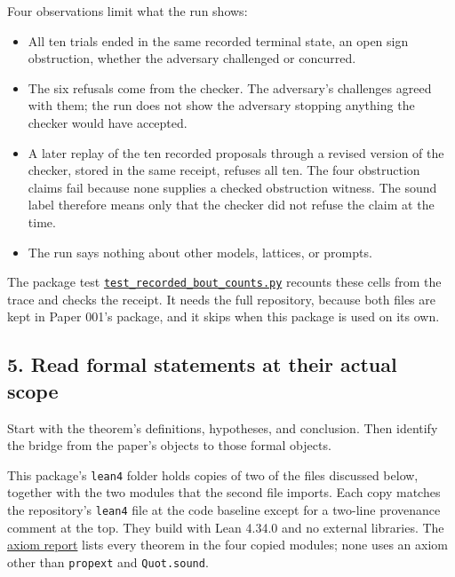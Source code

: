 \documentclass[
  11pt,
]{article}
\newcommand{\passthrough}[1]{#1}
\providecommand{\tightlist}{%
  \setlength{\itemsep}{0pt}\setlength{\parskip}{0pt}}
\begin{document}
Four observations limit what the run shows:

\begin{itemize}
\tightlist
\item
  All ten trials ended in the same recorded terminal state, an open sign
  obstruction, whether the adversary challenged or concurred.
\item
  The six refusals come from the checker. The adversary's challenges
  agreed with them; the run does not show the adversary stopping
  anything the checker would have accepted.
\item
  A later replay of the ten recorded proposals through a revised version
  of the checker, stored in the same receipt, refuses all ten. The four
  obstruction claims fail because none supplies a checked obstruction
  witness. The sound label therefore means only that the checker did not
  refuse the claim at the time.
\item
  The run says nothing about other models, lattices, or prompts.
\end{itemize}

The package test
\href{https://github.com/dbccpage/the_symbol_game/blob/52cb5457f6c485ba548cfd292f6012a941ed22cf/omega_engine_atlas/coda_atlas/omega_engine_symbol_game/009_pfp_adversarial_dialectics_and_terminal_reality_gates/code/tests/test_recorded_bout_counts.py}{\nolinkurl{test_recorded_bout_counts.py}}
recounts these cells from the trace and checks the receipt. It needs the
full repository, because both files are kept in Paper 001's package, and
it skips when this package is used on its own.

\subsection{5. Read formal statements at their actual
scope}\label{read-formal-statements-at-their-actual-scope}

Start with the theorem's definitions, hypotheses, and conclusion. Then
identify the bridge from the paper's objects to those formal objects.

This package's \passthrough{\lstinline!lean4!} folder holds copies of
two of the files discussed below, together with the two modules that the
second file imports. Each copy matches the repository's
\passthrough{\lstinline!lean4!} file at the code baseline except for a
two-line provenance comment at the top. They build with Lean 4.34.0 and
no external libraries. The
\href{https://github.com/dbccpage/the_symbol_game/blob/52cb5457f6c485ba548cfd292f6012a941ed22cf/omega_engine_atlas/coda_atlas/omega_engine_symbol_game/009_pfp_adversarial_dialectics_and_terminal_reality_gates/lean4/axiom_report.txt}{axiom
report} lists every theorem in the four copied modules; none uses an
axiom other than \passthrough{\lstinline!propext!} and
\passthrough{\lstinline!Quot.sound!}.
\end{document}
